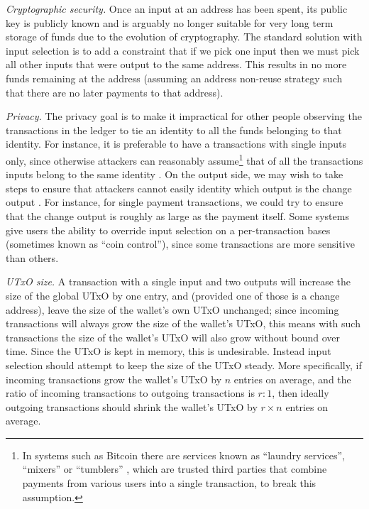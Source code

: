 \documentclass{article}
\numberwithin{equation}{lemma}
\begin{document}
\emph{Cryptographic security.}
Once an input at an address has been spent, its public key is publicly
known and is arguably no longer suitable for very long term storage of funds due
to the evolution of cryptography. The standard solution with input selection is
to add a constraint that if we pick one input then we must pick all other inputs
that were output to the same address. This results in no more funds remaining at
the address (assuming an address non-reuse strategy such that there are no later
payments to that address).

\emph{Privacy.}
The privacy goal is to make it impractical for other people observing the
transactions in the ledger to tie an identity to all the funds belonging to that
identity. For instance, it is preferable to have a transactions with single
inputs only, since otherwise attackers can reasonably assume\footnote{In systems
such as Bitcoin there are services known as ``laundry services'', ``mixers'' or
``tumblers'' \citep{10.1007/978-3-319-70290-2_18}, which are trusted third
parties that combine payments from various users into a single transaction, to
break this assumption.}  that of all the transactions inputs belong to the same
identity \citep{fergal}. On the output side, we may wish to take steps to ensure
that attackers cannot easily identity which output is the change output
\citep{8260674}. For instance, for single payment transactions, we could try to
ensure that the change output is roughly as large as the payment itself. Some
systems give users the ability to override input selection on a per-transaction
bases (sometimes known as ``coin control''), since some transactions are more
sensitive than others.

\emph{UTxO size.}
A transaction with a single input and two outputs will increase the size of the
global UTxO by one entry, and (provided one of those is a change address), leave
the size of the wallet's own UTxO unchanged; since incoming transactions will
always grow the size of the wallet's UTxO, this means with such transactions the
size of the wallet's UTxO will also grow without bound over time. Since the UTxO
is kept in memory, this is undesirable. Instead input selection should attempt
to keep the size of the UTxO steady. More specifically, if incoming transactions
grow the wallet's UTxO by $n$ entries on average, and the ratio of incoming
transactions to outgoing transactions is $r : 1$, then ideally outgoing
transactions should shrink the wallet's UTxO by $r \times n$ entries on average.
\end{document}
